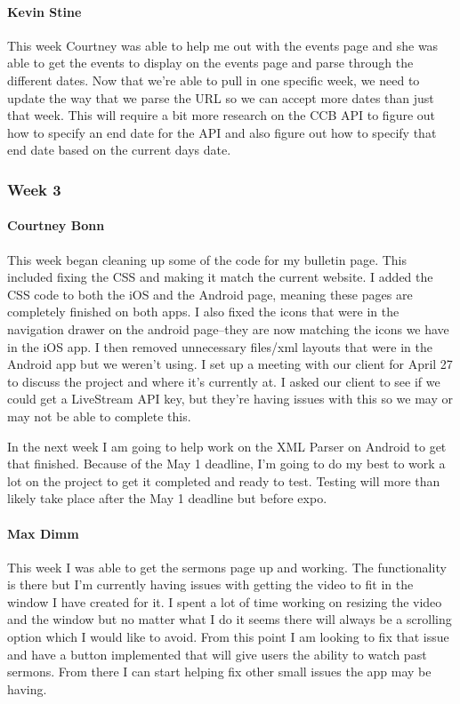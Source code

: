 			\paragraph{Kevin Stine}
			This week Courtney was able to help me out with the events page and she was able to get the events to display on the events page and parse through the different dates. Now that we're able to pull in one specific week, we need to update the way that we parse the URL so we can accept more dates than just that week. This will require a bit more research on the CCB API to figure out how to specify an end date for the API and also figure out how to specify that end date based on the current days date.
		
		\subsubsection{Week 3}
		
			\paragraph{Courtney Bonn}
			This week began cleaning up some of the code for my bulletin page. This included fixing the CSS and making it match the current website. I added the CSS code to both the iOS and the Android page, meaning these pages are completely finished on both apps. I also fixed the icons that were in the navigation drawer on the android page--they are now matching the icons we have in the iOS app. I then removed unnecessary files/xml layouts that were in the Android app but we weren't using. I set up a meeting with our client for April 27 to discuss the project and where it's currently at. I asked our client to see if we could get a LiveStream API key, but they're having issues with this so we may or may not be able to complete this.

In the next week I am going to help work on the XML Parser on Android to get that finished. Because of the May 1 deadline, I'm going to do my best to work a lot on the project to get it completed and ready to test. Testing will more than likely take place after the May 1 deadline but before expo.

			\paragraph{Max Dimm}
			This week I was able to get the sermons page up and working. The functionality is there but I'm currently having issues with getting the video to fit in the window I have created for it. I spent a lot of time working on resizing the video and the window but no matter what I do it seems there will always be a scrolling option which I would like to avoid. From this point I am looking to fix that issue and have a button implemented that will give users the ability to watch past sermons. From there I can start helping fix other small issues the app may be having.
			

